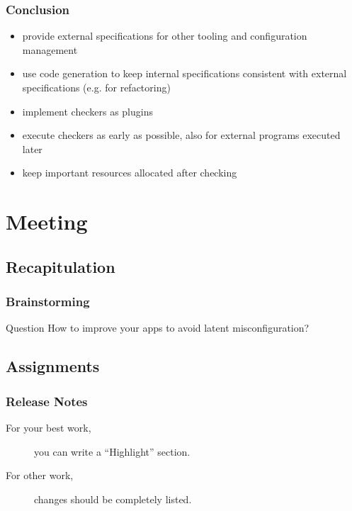 \begin{frame}
	\frametitle{Conclusion}

	\begin{itemize}[<+-| alert@+>]
	\item provide external specifications for other tooling and configuration management
	\item use code generation to keep internal specifications consistent with external specifications (e.g. for refactoring)
	\item implement checkers as plugins
	\item execute checkers as early as possible,
	also for external programs executed later
	\item keep important resources allocated after checking
	\end{itemize}
\end{frame}

\section{Meeting}

\subsection{Recapitulation}



\breakframe


\begin{assignment}
	\frametitle{Brainstorming}

	\begin{alertblock}{Question}
	How to improve your apps to avoid latent misconfiguration?
	\end{alertblock}
\end{assignment}


\breakframe

\subsection{Assignments}

\begin{assignment}
	\frametitle{Release Notes}

	\begin{description}
	\item[For your best work,] you can write a ``Highlight'' section.
	\item[For other work,] changes should be completely listed.
	\end{description}
\end{assignment}

